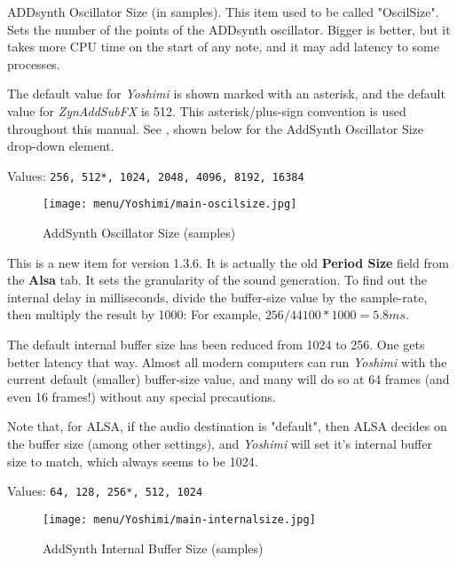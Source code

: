    \setcounter{ItemCounter}{0}      %

   ADDsynth Oscillator Size (in samples).  This item used to be called
   "OscilSize".  Sets the number of the points of the ADDsynth oscillator.
   Bigger is better, but it takes more CPU time on the start of any note, and
   it may add latency to some processes.

   The default value for \textsl{Yoshimi} is shown marked with an asterisk,
   and the default value for \textsl{ZynAddSubFX} is 512.
   This asterisk/plus-sign convention is used throughout this manual.
   See ,
   shown below for the AddSynth Oscillator Size drop-down element.

   Values: \texttt{256, 512*, 1024, 2048, 4096, 8192, 16384}

\begin{figure}[H]
   \centering 
   \texttt{[image: menu/Yoshimi/main-oscilsize.jpg]}
   \caption[OscilSize Values]{AddSynth Oscillator Size (samples)}
   \label{fig:yoshimi_oscilsize_values}
\end{figure}

   This is a new item for version 1.3.6.  It is actually the old
   \textbf{Period Size} field from the \textbf{Alsa} tab.
   It sets the granularity of the sound generation.
   To find out the internal delay in milliseconds, divide the
   buffer-size value by the sample-rate, then multiply the result by 1000:
   For example, \(256 / 44100 * 1000 = 5.8 ms\).

   The default internal buffer size has been reduced from 1024 to 256.  One
   gets better latency that way.  Almost all modern computers can run
   \textsl{Yoshimi} with the current default (smaller) buffer-size value, and
   many will do so at 64 frames (and even 16 frames!)
   without any special precautions.
   
   Note that, for ALSA, if the audio destination is "default",
   then ALSA decides on the buffer size (among other settings), and
   \textsl{Yoshimi} will set it's internal buffer size to match,
   which always seems to be 1024.

   Values: \texttt{64, 128, 256*, 512, 1024}

\begin{figure}[H]
   \centering 
   \texttt{[image: menu/Yoshimi/main-internalsize.jpg]}
   \caption[Internal Size Values]{AddSynth Internal Buffer Size (samples)}
   \label{fig:yoshimi_internalsize_values}
\end{figure}


